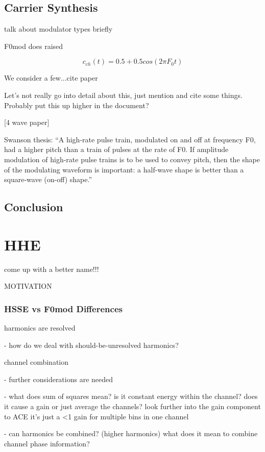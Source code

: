\documentclass [11pt, proquest] {uwthesis}[2015/03/03]
\begin{document}
 


\section{Carrier Synthesis}

talk about modulator types briefly

F0mod does raised

$$c_{ch}(t) = 0.5 + 0.5cos(2\pi F_0t)$$


We consider a few...cite paper

Let's not really go into detail about this, just mention and cite some things.  Probably put this up higher in the document?

[4 wave paper]

Swanson thesis: ``A high-rate pulse train, modulated on and off at frequency F0, had a higher pitch than a train of pulses at the rate of F0. If amplitude modulation of high-rate pulse trains is to be used to convey pitch, then the shape of the modulating waveform is important: a half-wave shape is better than a square-wave (on-off) shape.''


\section{Conclusion}



\chapter{HHE}
come up with a better name!!!

MOTIVATION

\subsection{HSSE vs F0mod Differences}

harmonics are resolved

 - how do we deal with should-be-unresolved harmonics?

channel combination

 - further considerations are needed

 - what does sum of squares mean? is it constant energy within the channel?  does it cause a gain or just average the channels?  look further into the gain component to ACE
    it's just a <1 gain for multiple bins in one channel

 - can harmonics be combined? (higher harmonics) what does it mean to combine channel phase information?
\end{document}
